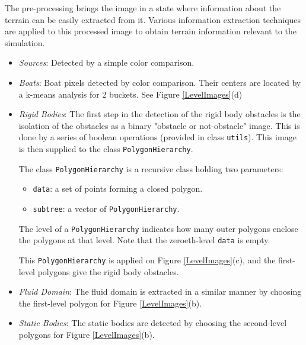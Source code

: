 The pre-processing brings the image in a state where information about the terrain can be easily extracted from it. Various information extraction techniques are applied to this processed image to obtain terrain information relevant to the simulation.

\begin{itemize}
	\item \textit{Sources}: Detected by a simple color comparison.
	\item \textit{Boats}: Boat pixels detected by color comparison. Their centers are located by a k-means analysis for 2 buckets. See Figure \ref{LevelImages}(d)
	\item \textit{Rigid Bodies}: The first step in the detection of the rigid body obstacles is the isolation of the obstacles as a binary "obstacle or not-obstacle" image. This is done by a series of boolean operations (provided in class \lstinline|utils|). This image is then supplied to the class \lstinline|PolygonHierarchy|.

The class \lstinline|PolygonHierarchy| is a recursive class holding two parameters: 
	\begin{itemize}
		\item \lstinline|data|: a set of points forming a closed polygon.
		\item \lstinline|subtree|: a vector of \lstinline|PolygonHierarchy|.
	\end{itemize}
The level of a \lstinline|PolygonHierarchy| indicates how many outer polygons enclose the polygons at that level. Note that the zeroeth-level \lstinline|data| is empty.

This \lstinline|PolygonHierarchy| is applied on Figure \ref{LevelImages}(c), and the first-level polygons give the rigid body obstacles.

	\item \textit{Fluid Domain}: The fluid domain is extracted in a similar manner by choosing the first-level polygon for Figure \ref{LevelImages}(b).

	\item \textit{Static Bodies}: The static bodies are detected by choosing the second-level polygons for Figure \ref{LevelImages}(b).

\end{itemize}
